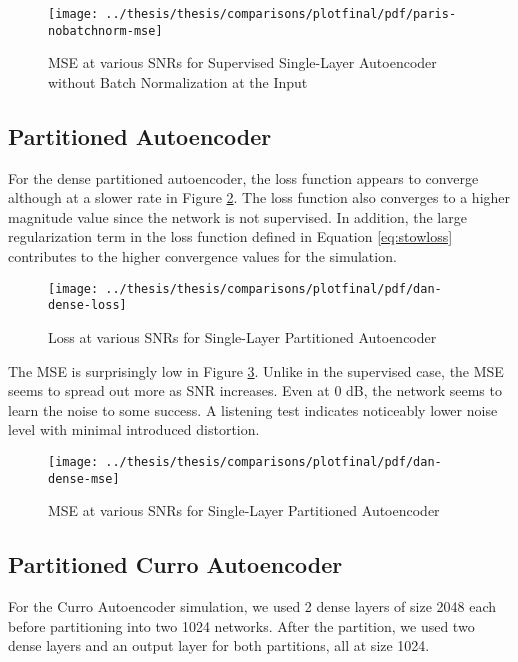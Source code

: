 \begin{figure}[!ht]
\centering
\texttt{[image: ../thesis/thesis/comparisons/plotfinal/pdf/paris-nobatchnorm-mse]}
\caption{MSE at various SNRs for Supervised Single-Layer Autoencoder without Batch Normalization at the Input}\label{fig:paris-mse}
\end{figure}


\subsection{Partitioned Autoencoder}

For the dense partitioned autoencoder, the loss function appears to converge although at a slower rate in Figure \ref{fig:dan-loss}. The loss function also converges to a higher magnitude value since the network is not supervised. In addition, the large regularization term in the loss function defined in Equation \ref{eq:stowloss} contributes to the higher convergence values for the simulation. 

\begin{figure}[!ht]
\centering
\texttt{[image: ../thesis/thesis/comparisons/plotfinal/pdf/dan-dense-loss]}
\caption{Loss at various SNRs for Single-Layer Partitioned Autoencoder\cite{stow}}
\label{fig:dan-loss}
\end{figure}

The MSE is surprisingly low in Figure \ref{fig:dan-mse}. Unlike in the supervised case, the MSE seems to spread out more as SNR increases. Even at 0 dB, the network seems to learn the noise to some success. A listening test indicates noticeably lower noise level with minimal introduced distortion.

\begin{figure}[!ht]
\centering
\texttt{[image: ../thesis/thesis/comparisons/plotfinal/pdf/dan-dense-mse]}
\caption{MSE at various SNRs for Single-Layer Partitioned Autoencoder\cite{stow}}
\label{fig:dan-mse}
\end{figure}

\subsection{Partitioned Curro Autoencoder}

For the Curro Autoencoder simulation, we used 2 dense layers of size 2048 each before partitioning into two 1024 networks. After the partition, we used two dense layers and an output layer for both partitions, all at size 1024.

